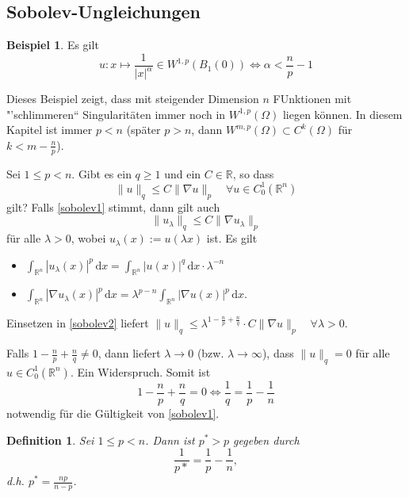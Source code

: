 \documentclass[
paper=a4,
bibtotocnumbered,
liststotocnumbered,
tablecaptionabove,
pointlessnumbers,
twoside,
openright,
10pt
]
{report}
\newtheorem{df}[thm]{Definition}
\theoremstyle{definition}
\newtheorem*{bsp}{Beispiel}
\numberwithin{equation}{chapter}
\begin{document}
\subsection{Sobolev-Ungleichungen}
\begin{bsp}
	Es gilt
	\begin{equation}
		u: x \mapsto \frac{1}{|x|^\alpha} \in W^{1,p}(B_1(0)) \iff \alpha < \frac{n}{p}-1
	\end{equation}
\end{bsp}
Dieses Beispiel zeigt, dass mit steigender Dimension $n$ FUnktionen mit "'schlimmeren`` Singularitäten immer noch in $W^{1,p}(\Omega)$ liegen können. In diesem Kapitel ist immer $p<n$ (später $p>n$, dann $W^{m,p}(\Omega) \subset C^k(\Omega)$ für $k<m-\frac{n}{p}$).

Sei $1\le p <n$. Gibt es ein $q\ge 1$ und ein $C\in \mathbb R$, so dass
\begin{equation}\label{sobolev1}
\| u\|_q \le C \| \nabla u \|_p \quad \forall u\in C_0^1(\mathbb R^n)
\end{equation}
gilt?  Falls \eqref{sobolev1} stimmt, dann gilt auch 
\begin{equation}\label{sobolev2}
\| u_\lambda\|_q \le C \| \nabla u_\lambda\|_p
\end{equation}
für alle $\lambda>0$, wobei $u_\lambda(x):= u(\lambda x)$ ist. Es gilt
\begin{itemize}
\item $\int_{\mathbb R^n} |u_\lambda(x)|^p \, \mathrm dx = \int_{\mathbb R^n} |u(x)|^q \, \mathrm dx \cdot \lambda^{-n}$\\
\item $\int_{\mathbb R^n} |\nabla u_\lambda(x)|^p \, \mathrm dx = \lambda^{p-n} \int_{\mathbb R^n} |\nabla u(x)|^p \, \mathrm dx$.
\end{itemize}
Einsetzen in \eqref{sobolev2} liefert $\| u\|_q \le \lambda^{1-\frac{n}{p} + \frac{n}{q}} \cdot C \| \nabla u \|_p \quad \forall \lambda>0$.

Falls $1-\frac{n}{p} + \frac{n}{q} \neq 0$, dann liefert $\lambda \to 0$ (bzw. $\lambda \to \infty$), dass $\| u\|_q=0$ für alle $u\in C_0^1(\mathbb R^n)$. Ein Widerspruch. Somit ist
\begin{equation}
	1- \frac{n}{p} + \frac{n}{q}=0 \iff \frac{1}{q}=\frac{1}{p} - \frac{1}{n}
\end{equation}
notwendig für die Gültigkeit von \eqref{sobolev1}. 
\begin{df}
Sei $1\le p <n$. Dann ist $p^* >p$ gegeben durch
\begin{equation}
	\frac{1}{p*}= \frac{1}{p} - \frac{1}{n},
\end{equation}
d.h. $p^* = \frac{np}{n-p}$.
\end{df}
\end{document}
